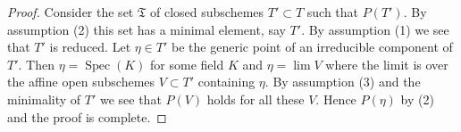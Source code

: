 \documentclass[10pt,a4paper]{amsart}
\theoremstyle{plain}
\theoremstyle{definition}
\theoremstyle{remark}
\numberwithin{equation}{subsection}
\def\lim{\mathop{\mathrm{lim}}\nolimits}
\def\Spec{\mathop{\mathrm{Spec}}}
\begin{document}
\begin{proof}
Consider the set $\mathfrak T$ of closed subschemes $T' \subset T$
such that $P(T')$. By assumption (2) this set has a minimal element,
say $T'$. By assumption (1) we see that $T'$ is reduced.
Let $\eta \in T'$ be the generic point of an irreducible
component of $T'$. Then $\eta = \Spec(K)$ for some field
$K$ and $\eta = \lim V$ where the limit is over the affine
open subschemes $V \subset T'$ containing $\eta$.
By assumption (3) and the minimality of $T'$ we see
that $P(V)$ holds for all these $V$. Hence $P(\eta)$
by (2) and the proof is complete.
\end{proof}
\end{document}
